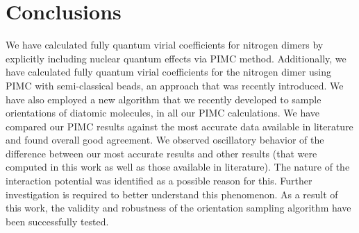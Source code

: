     \section{Conclusions}
    \label{sec:conclusion}
        We have calculated fully quantum virial coefficients for nitrogen dimers by explicitly including nuclear quantum effects via PIMC method. Additionally, we have calculated fully quantum virial coefficients for the nitrogen dimer using PIMC with semi-classical beads, an approach that was recently \cite{Fomms2016} introduced. We have also employed a new algorithm that we recently \cite{hydrogen} developed to sample orientations of diatomic molecules, in all our PIMC calculations. We have compared our PIMC results against the most accurate data available in literature and found overall good agreement. We observed oscillatory behavior of the difference between our most accurate results and other results (that were computed in this work as well as those available in literature). The nature of the interaction potential was identified as a possible reason for this. Further investigation is required to better understand this phenomenon. As a result of this work, the validity and robustness of the orientation sampling algorithm have been successfully tested.

